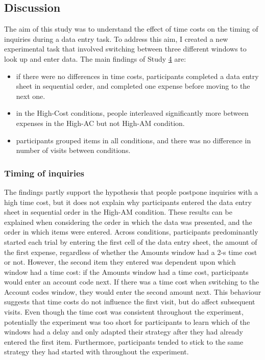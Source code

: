 \subsection{Discussion}
The aim of this study was to understand the effect of time costs on the timing of inquiries during a data entry task. To address this aim, I created a new experimental task that involved switching between three different windows to look up and enter data. The main findings of Study \hyperref[st:Study4]{4} are:

\begin{itemize}
\item
if there were no differences in time costs, participants completed a data entry sheet in sequential order, and completed one expense before moving to the next one. 
\item
in the High-Cost conditions, people interleaved significantly more between expenses in the High-AC but not High-AM condition. 
\item
participants grouped items in all conditions, and there was no difference in number of visits between conditions.
\end{itemize}

\subsubsection{Timing of inquiries}
The findings partly support the hypothesis that people postpone inquiries with a high time cost, but it does not explain why participants entered the data entry sheet in sequential order in the High-AM condition. 
These results can be explained when considering the order in which the data was presented, and the order in which items were entered. Across conditions, participants predominantly started each trial by entering the first cell of the data entry sheet, the amount of the first expense, regardless of whether the Amounts window had a 2-s time cost or not. However, the second item they entered was dependent upon which window had a time cost: if the Amounts window had a time cost, participants would enter an account code next. If there was a time cost when switching to the Account codes window, they would enter the second amount next.
This behaviour suggests that time costs do not influence the first visit, but do affect subsequent visits. Even though the time cost was consistent throughout the experiment, potentially the experiment was too short for participants to learn which of the windows had a delay and only adapted their strategy after they had already entered the first item. Furthermore, participants tended to stick to the same strategy they had started with throughout the experiment.

